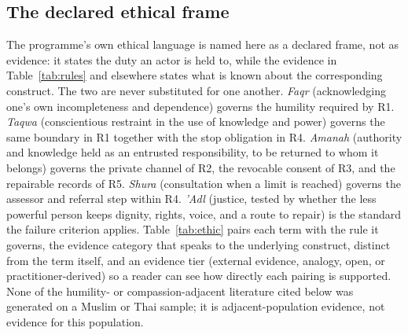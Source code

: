 \subsection{The declared ethical frame}
The programme's own ethical language is named here as a declared frame, not as evidence: it states the
duty an actor is held to, while the evidence in Table~\ref{tab:rules} and elsewhere states what is
known about the corresponding construct. The two are never substituted for one another.
\emph{Faqr} (acknowledging one's own incompleteness and dependence) governs the humility required by
R1. \emph{Taqwa} (conscientious restraint in the use of knowledge and power) governs the same
boundary in R1 together with the stop obligation in R4. \emph{Amanah} (authority and knowledge held as
an entrusted responsibility, to be returned to whom it belongs) governs the private channel of R2, the
revocable consent of R3, and the repairable records of R5. \emph{Shura} (consultation when a limit is
reached) governs the assessor and referral step within R4. \emph{'Adl} (justice, tested by whether the
less powerful person keeps dignity, rights, voice, and a route to repair) is the standard the
failure criterion applies. Table~\ref{tab:ethic} pairs each term with the rule it governs, the
evidence category that speaks to the underlying construct, distinct from the term itself, and an
evidence tier (external evidence, analogy, open, or practitioner-derived) so a reader can see how
directly each pairing is supported. None of the humility- or compassion-adjacent literature cited below
was generated on a Muslim or Thai sample; it is adjacent-population evidence, not evidence for this
population.

